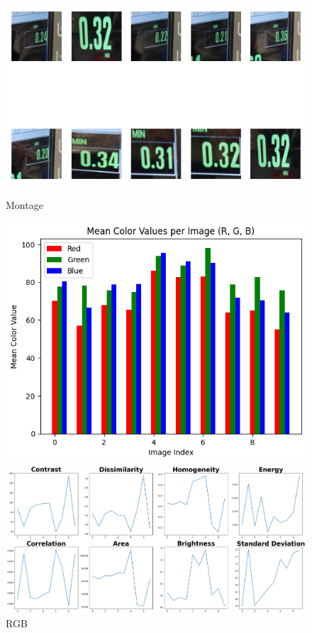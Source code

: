 \begin{figure}[ht]
    \centering
    \begin{minipage}[t]{0.25\textwidth}
        \centering
        \includegraphics[width=\textwidth]{Figures/EDA_Charts/7/montage.png}
        \caption*{Montage}
    \end{minipage}\hfill
    \begin{minipage}[t]{0.25\textwidth}
        \centering
        \includegraphics[width=\textwidth]{Figures/EDA_Charts/7/rgb.png}
        \caption*{RGB}
    \end{minipage}\hfill
    \begin{minipage}[t]{0.50\textwidth}
        \centering
        \includegraphics[width=\textwidth]{Figures/EDA_Charts/7/da.png}

\end{minipage}
\end{figure}
